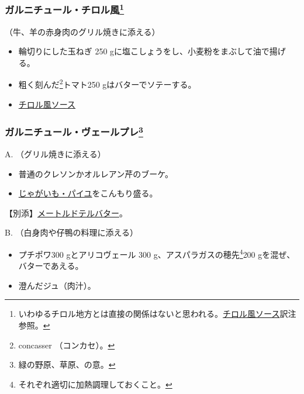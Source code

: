 \begin{recette}
\atoaki{}

\hypertarget{garniture-a-la-tyrolienne}{%
\subsubsection[ガルニチュール・チロル風]{\texorpdfstring{ガルニチュール・チロル風\footnote{いわゆるチロル地方とは直接の関係はないと思われる。\protect\hyperlink{sauce-tyrolienne}{チロル風ソース}訳注参照。}}{ガルニチュール・チロル風}}\label{garniture-a-la-tyrolienne}}



（牛、羊の赤身肉のグリル焼きに添える）

\begin{itemize}
\item
  輪切りにした玉ねぎ 250 gに塩こしょうをし、小麦粉をまぶして油で揚げる。
\item
  粗く刻んだ\footnote{concasser （コンカセ）。}トマト250
  gはバターでソテーする。
\item
  \protect\hyperlink{sauce-tyrolienne}{チロル風ソース}
\end{itemize}

\atoaki{}

\hypertarget{garniture-vert-pre}{%
\subsubsection[ガルニチュール・ヴェールプレ]{\texorpdfstring{ガルニチュール・ヴェールプレ\footnote{緑の野原、草原、の意。}}{ガルニチュール・ヴェールプレ}}\label{garniture-vert-pre}}



A. （グリル焼きに添える）

\begin{itemize}
\item
  普通のクレソンかオルレアン芹のブーケ。
\item
  \protect\hyperlink{pommes-de-terre-pailles}{じゃがいも・パイユ}をこんもり盛る。
\end{itemize}

【別添】\protect\hyperlink{beurre-a-la-maitre-d-hotel}{メートルドテルバター}。

B. （白身肉や仔鴨の料理に添える）

\begin{itemize}
\item
  プチポワ300 gとアリコヴェール 300 g、アスパラガスの穂先\footnote{それぞれ適切に加熱調理しておくこと。}200
  gを混ぜ、バターであえる。
\item
  澄んだジュ（肉汁）。
\end{itemize}

\end{recette}

 
